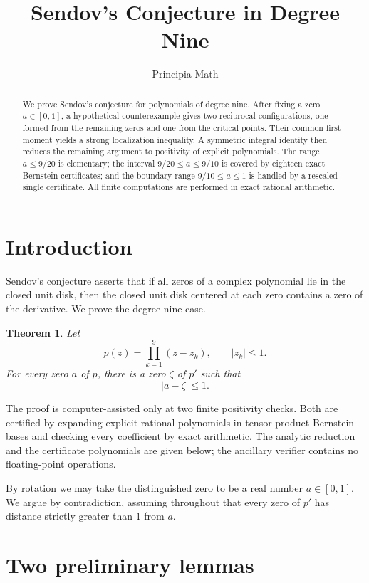 \documentclass[11pt]{article}
\title{Sendov's Conjecture in Degree Nine}
\author{Principia Math}
\date{}
\newtheorem{theorem}{Theorem}[section]
\theoremstyle{remark}
\begin{document}
\maketitle

\begin{abstract}
We prove Sendov's conjecture for polynomials of degree nine.  After fixing a zero
$a\in[0,1]$, a hypothetical counterexample gives two reciprocal configurations,
one formed from the remaining zeros and one from the critical points.  Their
common first moment yields a strong localization inequality.  A symmetric
integral identity then reduces the remaining argument to positivity of explicit
polynomials.  The range $a\le 9/20$ is elementary; the interval
$9/20\le a\le 9/10$ is covered by eighteen exact Bernstein certificates; and
the boundary range $9/10\le a\le1$ is handled by a rescaled single certificate.
All finite computations are performed in exact rational arithmetic.
\end{abstract}

\section{Introduction}

Sendov's conjecture asserts that if all zeros of a complex polynomial lie in the
closed unit disk, then the closed unit disk centered at each zero contains a
zero of the derivative.  We prove the degree-nine case.

\begin{theorem}\label{thm:main}
Let
\[
 p(z)=\prod_{k=1}^{9}(z-z_k),\qquad |z_k|\le1.
\]
For every zero $a$ of $p$, there is a zero $\zeta$ of $p'$ such that
\[
 |a-\zeta|\le1.
\]
\end{theorem}

The proof is computer-assisted only at two finite positivity checks.  Both are
certified by expanding explicit rational polynomials in tensor-product
Bernstein bases and checking every coefficient by exact arithmetic.  The
analytic reduction and the certificate polynomials are given below; the
ancillary verifier contains no floating-point operations.

By rotation we may take the distinguished zero to be a real number
$a\in[0,1]$.  We argue by contradiction, assuming throughout that every zero
of $p'$ has distance strictly greater than $1$ from $a$.

\section{Two preliminary lemmas}
\end{document}
